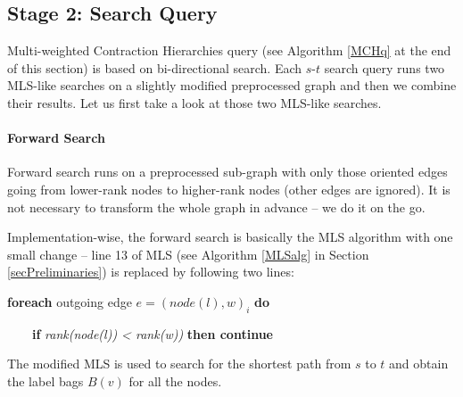 
\subsection{Stage 2: Search Query}
\label{subsecStage2}

Multi-weighted Contraction Hierarchies query (see Algorithm \ref{MCHq} at the end of this section) is based on bi-directional search.
Each $s$-$t$ search query runs two MLS-like searches on a slightly modified preprocessed graph
and then we combine their results. Let us first take a look at those two MLS-like searches.

\paragraph*{Forward Search}
Forward search runs on a preprocessed sub-graph with only those oriented edges going from 
lower-rank nodes to higher-rank nodes
(other edges are ignored). It is not necessary to transform the whole graph in advance -- we do it on the go.
\vskip 3mm

\noindent Implementation-wise, the forward search is basically the MLS algorithm with one small change -- line 13 of MLS (see Algorithm \ref{MLSalg} in Section \ref{secPreliminaries}) is replaced by following two lines:
\vskip 5mm

{\bf foreach} outgoing edge $e=(node(l),w)_i$ {\bf do}

\ \ \ \ {\bf if} {\em rank(node(l)) < rank(w))} {\bf then continue} 

\vskip 5mm
\noindent The modified MLS is used to search for the shortest path from $s$ to $t$ and obtain the label bags $B(v)$ for all the nodes.


